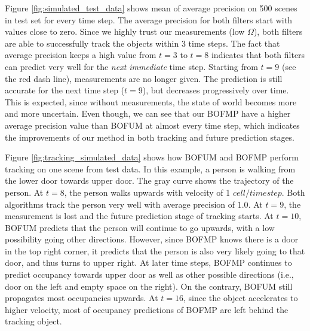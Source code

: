 Figure \ref{fig:simulated_test_data} shows mean of average precision on 500 scenes in test set for every time step. The average precision for both filters start with values close to zero. Since we highly trust our measurements (low $\Omega$), both filters are able to successfully track the objects within 3 time steps. The fact that average precision keeps a high value from $t=3$ to $t=8$ indicates that both filters can predict very well for the \textit{next immediate} time step. Starting from $t=9$ (see the red dash line), measurements are no longer given. The prediction is still accurate for the next time step ($t=9$), but decreases progressively over time.  This is expected, since without measurements, the state of world becomes more and more uncertain. Even though, we can see that our BOFMP have a higher average precision value than BOFUM at almost every time step, which indicates the improvements of our method in both tracking and future prediction stages.

Figure \ref{fig:tracking_simulated_data} shows how BOFUM and BOFMP perform tracking on one scene from test data. In this example, a person is walking from the lower door towards upper door. The gray curve shows the trajectory of the person. At $t=8$, the person walks upwards with velocity of 1 $cell/timestep$. Both algorithms track the person very well with average precision of $1.0$. At $t=9$, the measurement is lost and the future prediction stage of tracking starts. At $t=10$, BOFUM predicts that the person will continue to go upwards, with a low possibility going other directions. However, since BOFMP knows there is a door in the top right corner, it predicts that the person is also very likely going to that door, and thus turns to upper right. At later time steps, BOFMP continues to predict occupancy towards upper door as well as other possible directions (i.e., door on the left and empty space on the right). On the contrary, BOFUM still propagates most occupancies upwards. At $t=16$, since the object accelerates to higher velocity, most of occupancy predictions of BOFMP are left behind the tracking object.

